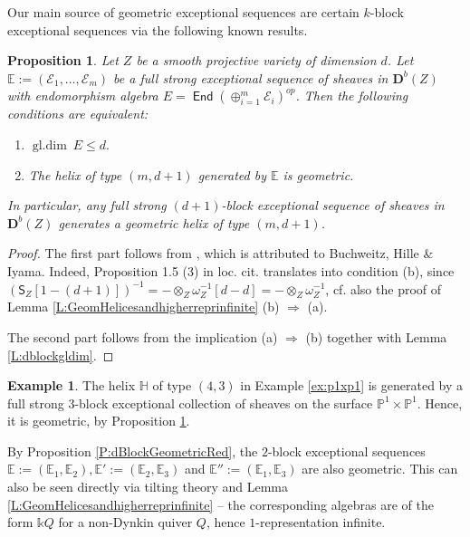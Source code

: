\documentclass[a4paper,11pt, reqno]{amsart}
\def\E{\mathbb E}
\def\H{\mathbb H}
\def\P{\mathbb P}
\def\DD{\mathbf D}
\def\sE{\mathscr{E}}
\def\gldim{{\operatorname{gl.dim}\ }}
\newcommand{\opname}[1]{\operatorname{\mathsf{#1}}}
\newcommand{\End}{\opname{End}}
\newcommand{\op}{^{op}}
\def\Db{\DD^b}
\theoremstyle{plain}
\newtheorem{proposition}[dummy]{Proposition}
\theoremstyle{definition}
\newtheorem{example}[dummy]{Example}
\numberwithin{equation}{section}
\newlength{\arrow}
\begin{document}
Our main source of geometric exceptional sequences are certain $k$-block exceptional sequences via the following known results.

\begin{proposition}\label{prop:BHI}
    Let $Z$
    be a smooth projective variety of dimension $d$. Let $\E:=(\sE_1, \ldots, \sE_m)$ be a full strong exceptional sequence of \emph{sheaves} in $\Db(Z)$ with endomorphism algebra $E=\End(\oplus_{i=1}^m \sE_i)\op$.    
    Then the following conditions are equivalent:
    \begin{enumerate}[label=(\alph*)]
        \item $\gldim E\leq d.$
        \item The helix of type $({m}, d+1)$ generated by $\E$ is \emph{geometric}.
    \end{enumerate}
    In particular, any full strong $(d+1)$-block exceptional sequence of \emph{sheaves} in $\Db(Z)$ generates a geometric helix of type $({m}, d+1)$.
\end{proposition}
\begin{proof}
  The first part follows from \cite[Lemma 1.4 and Proposition 1.5]{Tomonaga2510}, which is attributed to Buchweitz, Hille \& Iyama. Indeed, Proposition 1.5 (3) in loc. cit. translates into condition (b), since $(\mathsf{S}_Z[1-(d+1)])^{-1}=-\otimes_Z\omega_Z^{-1}[d-d]=-\otimes_Z\omega_Z^{-1}$, cf. also the proof of Lemma \ref{L:GeomHelicesandhigherreprinfinite} (b) $\Rightarrow$ (a). 
  
  The second part follows from the implication (a) $\Rightarrow$ (b) together with Lemma \ref{L:dblockgldim}.
\end{proof}

\begin{example}
    The helix $\H$ of type $(4,3)$ in Example \ref{ex:p1xp1} is generated by a full strong  $3$-block exceptional collection of sheaves on the surface $\P^1 \times \P^1$. Hence, it is geometric, by Proposition \ref{prop:BHI}.

    By Proposition \ref{P:dBlockGeometricRed}, the $2$-block exceptional sequences $\E:=(\mathbb{E}_1, \E_2), \E':=(\mathbb{E}_2, \E_3)$ and $\E'':=(\mathbb{E}_1, \E_3)$ are also geometric. This can also be seen directly via tilting theory and Lemma \ref{L:GeomHelicesandhigherreprinfinite} -- the corresponding algebras are of the form $\mathbb{k}Q$ for a non-Dynkin quiver $Q$, hence $1$-representation infinite. 
\end{example}
\end{document}

